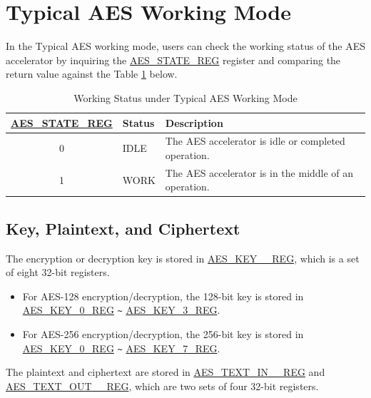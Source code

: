 \documentclass[main\_\_EN.tex]{subfiles}
\begin{document}
\clearpage
\section{Typical AES Working Mode}\label{sec:aes-typical-modes}

In the Typical AES working mode, 
users can check the working status of the AES accelerator by inquiring the \hyperref[regdesc:AESSTATEREG]{AES\_STATE\_REG} register and comparing the return value against the Table \ref{tab:aes-state-value-typical} below.

\begin{longtable}[c]{ | c | l | l| }
\caption{Working Status under Typical AES Working Mode}
\label{tab:aes-state-value-typical}
\\\hline 
\rowcolor{lightgray}
\hyperref[regdesc:AESSTATEREG]{AES\_STATE\_REG} & Status &  Description \\ \hline

    0                   & IDLE      &   The AES accelerator is idle or completed operation.\\ \hline
    1                   & WORK      &   The AES accelerator is in the middle of an operation.     \\ \hline
\end{longtable}

\subsection{Key, Plaintext, and Ciphertext}

The encryption or decryption key is stored in \hyperref[regdesc:AESKEYnREG]{AES\_KEY\_\_REG}, which is a set of eight 32-bit registers.

\begin{itemize}
    \item For AES-128 encryption/decryption, the 128-bit key is stored in \hyperref[regdesc:AESKEYnREG]{AES\_KEY\_0\_REG} \verb+~+ \hyperref[regdesc:AESKEYnREG]{AES\_KEY\_3\_REG}.
    \item For AES-256 encryption/decryption, the 256-bit key is stored in \hyperref[regdesc:AESKEYnREG]{AES\_KEY\_0\_REG} \verb+~+ \hyperref[regdesc:AESKEYnREG]{AES\_KEY\_7\_REG}.
\end{itemize}

The plaintext and ciphertext are stored in \hyperref[regdesc:AESTEXTINnREG]{AES\_TEXT\_IN\_\_REG} and \hyperref[regdesc:AESTEXTOUTnREG]{AES\_TEXT\_OUT\_\_REG}, which are two sets of four 32-bit registers.
\end{document}
